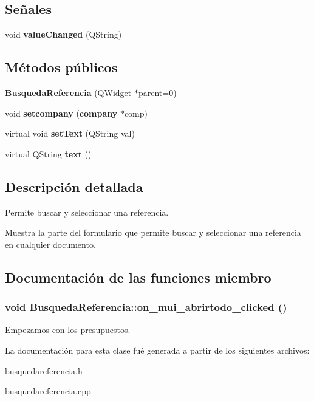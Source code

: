 \subsection*{Se\~{n}ales}
\begin{CompactItemize}
\item 
void {\bf value\-Changed} (QString)\label{classBusquedaReferencia_l0}

\end{CompactItemize}
\subsection*{M\'{e}todos p\'{u}blicos}
\begin{CompactItemize}
\item 
{\bf Busqueda\-Referencia} (QWidget $\ast$parent=0)\label{classBusquedaReferencia_a0}

\item 
void {\bf setcompany} ({\bf company} $\ast$comp)\label{classBusquedaReferencia_a1}

\item 
virtual void {\bf set\-Text} (QString val)\label{classBusquedaReferencia_a2}

\item 
virtual QString {\bf text} ()\label{classBusquedaReferencia_a3}

\end{CompactItemize}


\subsection{Descripci\'{o}n detallada}
Permite buscar y seleccionar una referencia. 

Muestra la parte del formulario que permite buscar y seleccionar una referencia en cualquier documento. 



\subsection{Documentaci\'{o}n de las funciones miembro}
\subsubsection{\setlength{\rightskip}{0pt plus 5cm}void Busqueda\-Referencia::on\_\-mui\_\-abrirtodo\_\-clicked ()\hspace{0.3cm}{\tt  [virtual, slot]}}\label{classBusquedaReferencia_i0}


Empezamos con los presupuestos. 

La documentaci\'{o}n para esta clase fu\'{e} generada a partir de los siguientes archivos:\begin{CompactItemize}
\item 
busquedareferencia.h\item 
busquedareferencia.cpp\end{CompactItemize}
